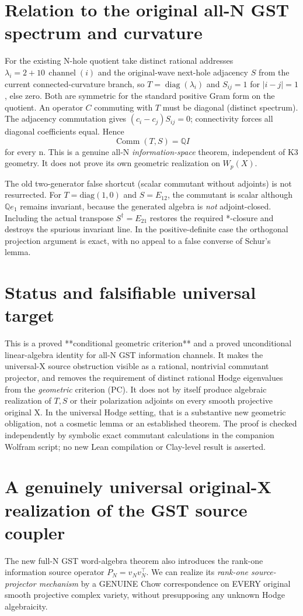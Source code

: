 \documentclass[11pt]{article}
\newcommand{\Q}{\mathbb Q}
\newcommand{\Comm}{\operatorname{Comm}}
\begin{document}
\section{Relation to the original all-N GST spectrum and curvature}
For the existing N-hole quotient take distinct rational addresses $\lambda_i=2+10\,\operatorname{channel}(i)$ and the original-wave next-hole adjacency $S$ from the current connected-curvature branch, so $T=\operatorname{diag}(\lambda_i)$ and $S_{ij}=1$ for $|i-j|=1$, else zero. Both are symmetric for the standard positive Gram form on the quotient. An operator $C$ commuting with $T$ must be diagonal (distinct spectrum). The adjacency commutation gives $(c_i-c_j)S_{ij}=0$; connectivity forces all diagonal coefficients equal. Hence
\[
 \boxed{\Comm(T,S)=\Q I}
\]
for every n. This is a genuine all-N \emph{information-space} theorem, independent of K3 geometry. It does not prove its own geometric realization on $W_p(X)$.

The old two-generator false shortcut (scalar commutant without adjoints) is not resurrected. For
$T=\mathrm{diag}(1,0)$ and $S=E_{12}$, the commutant is scalar although $\Q e_1$ remains invariant, because the generated algebra is \emph{not} adjoint-closed. Including the actual transpose $S^\dagger=E_{21}$ restores the required *-closure and destroys the spurious invariant line. In the positive-definite case the orthogonal projection argument is exact, with no appeal to a false converse of Schur's lemma.

\section{Status and falsifiable universal target}
This is a proved **conditional geometric criterion** and a proved unconditional linear-algebra identity for all-N GST information channels. It makes the universal-X source obstruction visible as a rational, nontrivial commutant projector, and removes the requirement of distinct rational Hodge eigenvalues from the \emph{geometric} criterion (PC). It does not by itself produce algebraic realization of $T,S$ or their polarization adjoints on every smooth projective original X. In the universal Hodge setting, that is a substantive new geometric obligation, not a cosmetic lemma or an established theorem. The proof is checked independently by symbolic exact commutant calculations in the companion Wolfram script; no new Lean compilation or Clay-level result is asserted.

\section{A genuinely universal original-X realization of the GST source coupler}
The new full-N GST word-algebra theorem also introduces the rank-one information source operator $P_N=v_Nv_N^\top$. We can realize its \emph{rank-one source-projector mechanism} by a GENUINE Chow correspondence on EVERY original smooth projective complex variety, without presupposing any unknown Hodge algebraicity.
\end{document}
